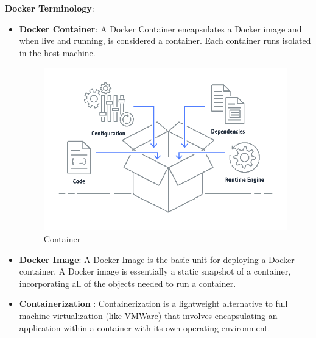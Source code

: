 \documentclass[11pt]{report}
\begin{document}
\begin{enumerate}
\begin{figure}[h!]
		\end{figure}
		\ \\
		\ \\
		\large
		\textbf{Docker Terminology}:
		\begin{itemize}
			\item
			\textbf{Docker Container}: A Docker Container encapsulates a Docker image and when live and running, is considered a container. Each container runs isolated in the host machine.
			\begin{figure}[h!]
    	\begin{center}
    		\includegraphics[scale=0.3]{containerization.png}
    		\caption{Container \cite{container}}
    	  \end{center}
	  
		\end{figure}
			\item
			\textbf{Docker Image}: A Docker Image is the basic unit for deploying a Docker container. A Docker image is essentially a static snapshot of a container, incorporating all of the objects needed to run a container.
			
			\item \textbf{Containerization} : Containerization is a lightweight alternative to full machine virtualization (like VMWare) that involves encapsulating an application within a container with its own operating environment.
			\ \\
			\ \\
			

\end{itemize}
\end{enumerate}
\end{document}
